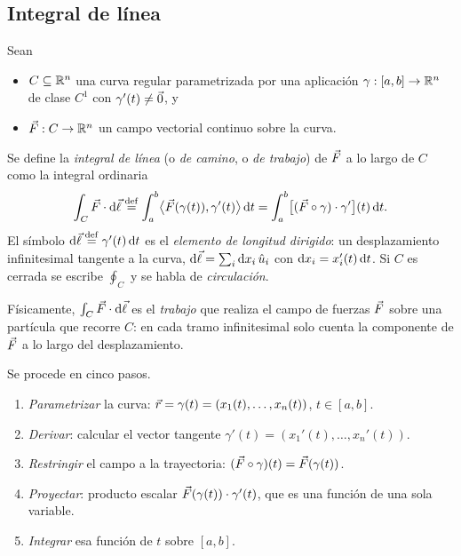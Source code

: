 \subsection{Integral de línea}\label{sec:linea}
\begin{definicion}\label{def:linea}
Sean
\begin{itemize}
  \item $C\subseteq\mathbb{R}^{n}$ una curva regular parametrizada por una aplicación
        $\gamma:[a,b]\to\mathbb{R}^{n}$ de clase $C^{1}$ con $\gamma'(t)\neq\vec{0}$, y
  \item $\vec{F}:C\to\mathbb{R}^{n}$ un campo vectorial continuo sobre la curva.
\end{itemize}
Se define la \emph{integral de línea} (o \emph{de camino}, o \emph{de trabajo})
de $\vec{F}$ a lo largo de $C$ como la integral ordinaria
\begin{equation}\label{eq:linea}
  \int_{C}\vec{F}\cdot\mathrm{d}\vec{\ell}\mathrel{\overset{\mathrm{def}}{=}}\int_{a}^{b}\bigl\langle\vec{F}(\gamma(t)),\gamma'(t)\bigr\rangle\,\mathrm{d} t
  =\int_{a}^{b}\bigl[(\vec{F}\circ\gamma)\cdot\gamma'\bigr](t)\,\mathrm{d} t .
\end{equation}
El símbolo $\mathrm{d}\vec{\ell}\mathrel{\overset{\mathrm{def}}{=}}\gamma'(t)\,\mathrm{d} t$ es el \emph{elemento de longitud
dirigido}: un desplazamiento infinitesimal tangente a la curva,
$\mathrm{d}\vec{\ell}=\sum_i\mathrm{d} x_i\,\hat{u}_{i}$ con $\mathrm{d} x_i=x_i'(t)\,\mathrm{d} t$. Si $C$ es cerrada se
escribe $\oint_C$ y se habla de \emph{circulación}.
\end{definicion}

Físicamente, $\int_C\vec{F}\cdot\mathrm{d}\vec{\ell}$ es el \emph{trabajo} que realiza el campo de
fuerzas $\vec{F}$ sobre una partícula que recorre $C$: en cada tramo infinitesimal
solo cuenta la componente de $\vec{F}$ a lo largo del desplazamiento.

\begin{notacion}\label{not:procedimiento-linea}
Se procede en cinco pasos.\begin{enumerate}[label=\textbf{\arabic*.}, itemsep=1pt]
  \item \emph{Parametrizar} la curva: $\vec{r}=\gamma(t)=(x_1(t),\ldots,x_n(t))$, $t\in[a,b]$.
  \item \emph{Derivar}: calcular el vector tangente $\gamma'(t)=(x_1'(t),\ldots,x_n'(t))$.
  \item \emph{Restringir} el campo a la trayectoria: $(\vec{F}\circ\gamma)(t)=\vec{F}(\gamma(t))$.
  \item \emph{Proyectar}: producto escalar $\vec{F}(\gamma(t))\cdot\gamma'(t)$, que es una función de una sola variable.
  \item \emph{Integrar} esa función de $t$ sobre $[a,b]$.
\end{enumerate}
\end{notacion}

